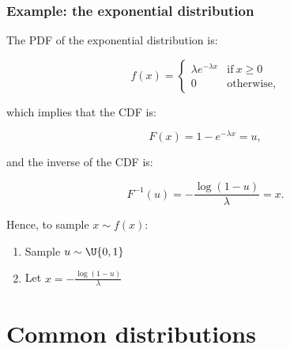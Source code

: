\documentclass{beamer}
\begin{document}
\begin{frame}
\frametitle{Example: the exponential distribution}

The PDF of the exponential distribution is:

\begin{equation*}
    f(x) = 
    \begin{cases}
      \lambda e ^{-\lambda x} & \text{if}\ x \geq 0 \\
      0 & \text{otherwise},
    \end{cases}
\end{equation*}

which implies that the CDF is:

\begin{equation*}
F(x) = 1 - e^{- \lambda x} = u,
\end{equation*}

and the inverse of the CDF is:

\begin{equation*}
F^{-1}(u) = -\frac{ \log(1 -u) } {\lambda}  = x.
\end{equation*}

Hence, to sample $x \sim f(x)$:
\begin{enumerate}
    \item Sample $u \sim \U{0,1}$
    \item Let $x = -\frac{ \log(1 -u) } {\lambda} $
\end{enumerate}

\end{frame}


\section{Common distributions}
\end{document}
